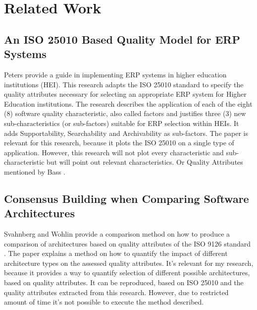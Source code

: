 \chapter{Related Work}\label{s:related}



\section*{An ISO 25010 Based Quality Model for ERP Systems}
Peters \etal \cite{Peters2020AnI2} provide a guide in implementing ERP systems in higher education institutions (HEI). This research adapts the ISO 25010 standard to specify the quality attributes necessary for selecting an appropriate ERP system for Higher Education institutions. The research describes the application of each of the eight (8) software quality characteristic, also called factors and justifies three (3) new sub-characteristics (or sub-factors) suitable for ERP selection within HEIs. It adds Supportability, Searchability and Archivability as sub-factors. The paper is relevant for this research, because it plots the ISO 25010 on a single type of application. However, this research will not plot every characteristic and sub-characteristic but will point out relevant characteristics. Or Quality Attributes mentioned by Bass \etal \cite{Bass2015SoftwareAI}.

\section*{Consensus Building when Comparing Software Architectures}
Svahnberg and Wohlin \cite{Svahnberg2002ConsensusBW} provide a comparison method on how to produce a comparison of architectures based on quality attributes of the ISO 9126 standard \cite{ISO9126}. The paper explains a method on how to quantify the impact of different architecture types on the assessed quality attributes. It's relevant for my research, because it provides a way to quantify selection of different possible architectures, based on quality attributes. It can be reproduced, based on ISO 25010 and the quality attributes extracted from this research. However, due to restricted amount of time it's not possible to execute the method described. 

